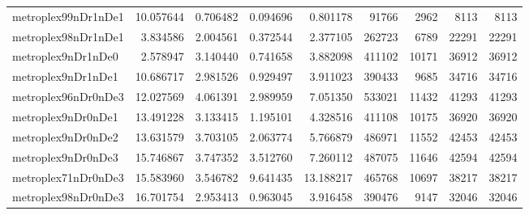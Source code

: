 \begin{longtable}{|l|r|r|r|r|r|r|r|r|}
metroplex99nDr1nDe1 & 10.057644 & 0.706482 & 0.094696 & 0.801178 & 91766 & 2962 & 8113 & 8113 \\
metroplex98nDr1nDe1 & 3.834586 & 2.004561 & 0.372544 & 2.377105 & 262723 & 6789 & 22291 & 22291 \\
metroplex9nDr1nDe0 & 2.578947 & 3.140440 & 0.741658 & 3.882098 & 411102 & 10171 & 36912 & 36912 \\
metroplex9nDr1nDe1 & 10.686717 & 2.981526 & 0.929497 & 3.911023 & 390433 & 9685 & 34716 & 34716 \\
metroplex96nDr0nDe3 & 12.027569 & 4.061391 & 2.989959 & 7.051350 & 533021 & 11432 & 41293 & 41293 \\
metroplex9nDr0nDe1 & 13.491228 & 3.133415 & 1.195101 & 4.328516 & 411108 & 10175 & 36920 & 36920 \\
metroplex9nDr0nDe2 & 13.631579 & 3.703105 & 2.063774 & 5.766879 & 486971 & 11552 & 42453 & 42453 \\
metroplex9nDr0nDe3 & 15.746867 & 3.747352 & 3.512760 & 7.260112 & 487075 & 11646 & 42594 & 42594 \\
metroplex71nDr0nDe3 & 15.583960 & 3.546782 & 9.641435 & 13.188217 & 465768 & 10697 & 38217 & 38217 \\
metroplex98nDr0nDe3 & 16.701754 & 2.953413 & 0.963045 & 3.916458 & 390476 & 9147 & 32046 & 32046 \\
\end{longtable}
